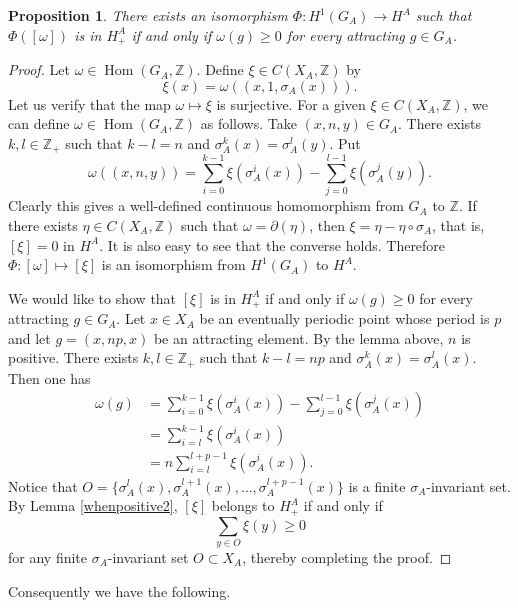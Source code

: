 \documentclass[11pt]{article}
\newtheorem{proposition}[theorem]{Proposition}
\theoremstyle{definition}
\numberwithin{equation}{section}
\newcommand{\Hom}{\operatorname{Hom}}
\newcommand{\Z}{\mathbb{Z}}
\begin{document}
\begin{proposition}
There exists an isomorphism $\Phi:H^1(G_A)\to H^A$ such that 
$\Phi([\omega])$ is in $H^A_+$ if and only if 
$\omega(g)\geq0$ for every attracting $g\in G_A$. 
\end{proposition}
\begin{proof}
Let $\omega\in\Hom(G_A,\Z)$. 
Define $\xi\in C(X_A,\Z)$ by 
\[
\xi(x)=\omega((x,1,\sigma_A(x))). 
\]
Let us verify that the map $\omega\mapsto\xi$ is surjective. 
For a given $\xi\in C(X_A,\Z)$, we can define $\omega\in\Hom(G_A,\Z)$ 
as follows. 
Take $(x,n,y)\in G_A$. 
There exists $k,l\in\Z_+$ 
such that $k-l=n$ and $\sigma_A^k(x)=\sigma_A^l(y)$. 
Put 
\[
\omega((x,n,y))
=\sum_{i=0}^{k-1}\xi(\sigma_A^i(x))-\sum_{j=0}^{l-1}\xi(\sigma_A^j(y)). 
\]
Clearly this gives a well-defined continuous homomorphism 
from $G_A$ to $\Z$. 
If there exists $\eta\in C(X_A,\Z)$ such that $\omega=\partial(\eta)$, 
then $\xi=\eta-\eta\circ\sigma_A$, that is, $[\xi]=0$ in $H^A$. 
It is also easy to see that the converse holds. 
Therefore $\Phi:[\omega]\mapsto[\xi]$ is an isomorphism 
from $H^1(G_A)$ to $H^A$. 

We would like to show that $[\xi]$ is in $H^A_+$ 
if and only if $\omega(g)\geq0$ for every attracting $g\in G_A$. 
Let $x\in X_A$ be an eventually periodic point whose period is $p$ 
and let $g=(x,np,x)$ be an attracting element. 
By the lemma above, $n$ is positive. 
There exists $k,l\in\Z_+$ 
such that $k-l=np$ and $\sigma_A^k(x)=\sigma_A^l(x)$. 
Then one has 
\begin{align*}
\omega(g)
&=\sum_{i=0}^{k-1}\xi(\sigma_A^i(x))-\sum_{j=0}^{l-1}\xi(\sigma_A^j(x))\\
&=\sum_{i=l}^{k-1}\xi(\sigma_A^i(x))\\
&=n\sum_{i=l}^{l+p-1}\xi(\sigma_A^i(x)). 
\end{align*}
Notice that $O=\{\sigma_A^l(x),\sigma_A^{l+1}(x),\dots,\sigma_A^{l+p-1}(x)\}$ 
is a finite $\sigma_A$-invariant set. 
By Lemma \ref{whenpositive2}, 
$[\xi]$ belongs to $H^A_+$ if and only if 
\[
\sum_{y\in O}\xi(y)\geq0
\]
for any finite $\sigma_A$-invariant set $O\subset X_A$, 
thereby completing the proof. 
\end{proof}

Consequently we have the following. 
\end{document}
